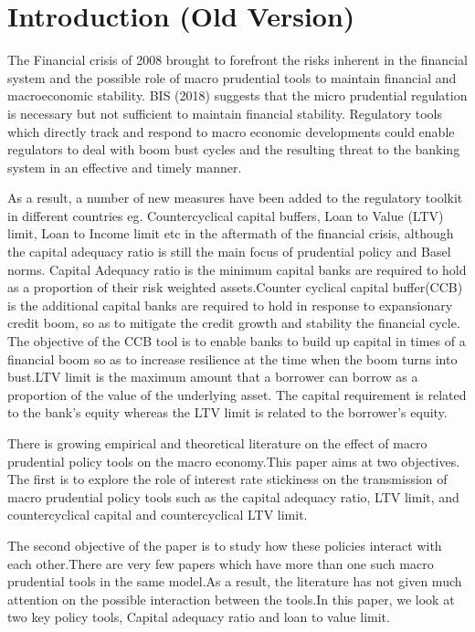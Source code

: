 \documentclass[12pt]{article}
\numberwithin{equation}{section}
\begin{document}
\section{Introduction (Old Version)}

The Financial crisis of 2008 brought to forefront the risks inherent in the financial system and the possible role of macro prudential tools to maintain financial and macroeconomic stability.  BIS (2018) suggests that the micro prudential regulation is necessary but not sufficient to maintain financial stability. Regulatory tools which directly track and respond to macro economic developments could enable regulators to deal with boom bust cycles and the resulting threat to the banking system in an effective and timely manner.

As a result, a number of new measures have been added to the regulatory toolkit in different countries eg. Countercyclical capital buffers, Loan to Value (LTV) limit, Loan to Income limit etc in the aftermath of the financial crisis, although the capital adequacy ratio is still the main focus of prudential policy and Basel norms.
Capital Adequacy ratio is the minimum capital banks are required to hold as a proportion of their risk weighted assets.Counter cyclical capital buffer(CCB) is the additional capital banks are required to hold in response to expansionary credit boom, so as to mitigate the credit growth and stability the financial cycle. The objective of the CCB tool is to enable banks to build up capital in times of a financial boom so as to increase resilience at the time when the boom turns into bust.LTV limit is the maximum amount that a borrower can borrow as a proportion of the value of the underlying asset. The capital requirement is related to the bank's equity whereas the LTV limit is related to the borrower's equity.

There is growing empirical and theoretical literature on the effect of macro prudential policy tools on the macro economy.This paper aims at two objectives. The first is to explore the role of interest rate stickiness on the transmission of macro prudential policy tools such as the capital adequacy ratio, LTV limit, and countercyclical capital and countercyclical LTV limit.

The second objective of the paper is to study how these policies interact with each other.There are very few papers which have more than one such macro prudential tools in the same model.As a result, the literature has not given much attention on the possible interaction between the tools.In this paper, we look at two key policy tools, Capital adequacy ratio and loan to value limit.
\end{document}
